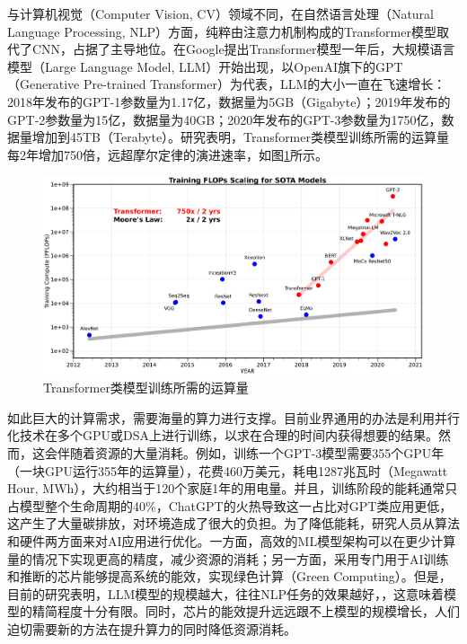 与计算机视觉（Computer Vision, CV）领域不同，在自然语言处理（Natural Language Processing, NLP）方面，纯粹由注意力机制构成的Transformer模型\cite{AI:attention_is_all}取代了CNN，占据了主导地位。在Google提出Transformer模型一年后，大规模语言模型（Large Language Model, LLM）开始出现，以OpenAI旗下的GPT（Generative Pre-trained Transformer）为代表，LLM的大小一直在飞速增长：2018年发布的GPT-1参数量为1.17亿，数据量为5GB（Gigabyte）；2019年发布的GPT-2参数量为15亿，数据量为40GB；2020年发布的GPT-3参数量为1750亿，数据量增加到45TB（Terabyte）。研究表明，Transformer类模型训练所需的运算量每2年增加750倍，远超摩尔定律的演进速率，如图\ref{AI:ai_and_compute}所示\cite{ai_and_memory_wall}。

\begin{figure}[htb]
    \centering
    \includegraphics[width=\textwidth]{figs/AI-Fig-ai_and_compute.pdf}
    \caption{Transformer类模型训练所需的运算量}
    \label{AI:ai_and_compute}
\end{figure}


如此巨大的计算需求，需要海量的算力进行支撑。目前业界通用的办法是利用并行化技术在多个GPU或DSA上进行训练，以求在合理的时间内获得想要的结果。然而，这会伴随着资源的大量消耗。例如，训练一个GPT-3模型需要355个GPU年（一块GPU运行355年的运算量），花费460万美元，耗电1287兆瓦时（Megawatt Hour, MWh），大约相当于120个家庭1年的用电量\cite{AI:carbon_google_2021,AI:zeus}。并且，训练阶段的能耗通常只占模型整个生命周期的40\%\cite{AI:carbon_google_2022}，ChatGPT的火热导致这一占比对GPT类应用更低，这产生了大量碳排放，对环境造成了很大的负担。为了降低能耗，研究人员从算法和硬件两方面来对AI应用进行优化。一方面，高效的ML模型架构可以在更少计算量的情况下实现更高的精度，减少资源的消耗；另一方面，采用专门用于AI训练和推断的芯片能够提高系统的能效，实现绿色计算（Green Computing）\cite{AI:green_computing}。但是，目前的研究表明，LLM模型的规模越大，往往NLP任务的效果越好，\cite{AI:llm_overview}，这意味着模型的精简程度十分有限。同时，芯片的能效提升远远跟不上模型的规模增长，人们迫切需要新的方法在提升算力的同时降低资源消耗。


